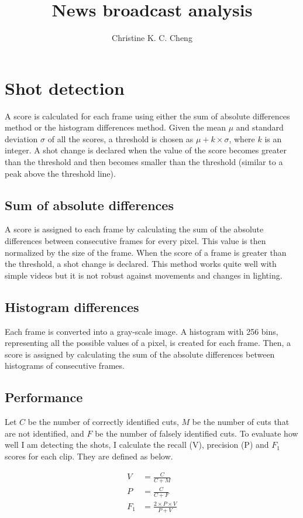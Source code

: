 \documentclass{article}
\title{News broadcast analysis}
\author{
	Christine K. C. Cheng
}
\begin{document}
\maketitle

\section{Shot detection}
A score is calculated for each frame using either the sum of absolute differences method or the histogram differences method. Given the mean $\mu$ and standard deviation $\sigma$ of all the scores, a threshold is chosen as $\mu + k\times \sigma$, where $k$ is an integer. A shot change is declared when the value of the score becomes greater than the threshold and then becomes smaller than the threshold (similar to a peak above the threshold line).

\subsection*{Sum of absolute differences}
A score is assigned to each frame by calculating the sum of the absolute differences between consecutive frames for every pixel. This value is then normalized by the size of the frame. When the score of a frame is greater than the threshold, a shot change is declared. This method works quite well with simple videos but it is not robust against movements and changes in lighting.

\subsection*{Histogram differences}
Each frame is converted into a gray-scale image. A histogram with 256 bins, representing all the possible values of a pixel, is created for each frame. Then, a score is assigned by calculating the sum of the absolute differences between histograms of consecutive frames.

\subsection*{Performance}
Let $C$ be the number of correctly identified cuts, $M$ be the number of cuts that are not identified, and $F$ be the number of falsely identified cuts. To evaluate how well I am detecting the shots, I calculate the recall (V), precision (P) and $F_1$ scores for each clip. They are defined as below.

\begin{equation}
\begin{split}
V &= \frac{C}{C + M} \\
P &= \frac{C}{C + F} \\
F_1 &= \frac{2 \times P \times V}{P + V} \\
\end{split}
\end{equation}
 
\end{document}
